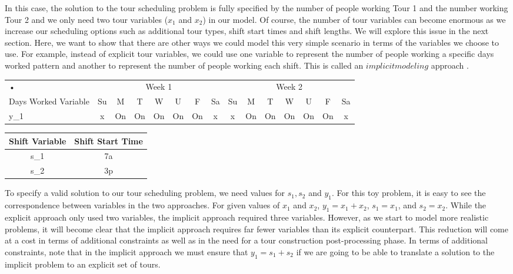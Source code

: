 \documentclass{article}
\begin{document}
In this case, the solution to the tour scheduling problem is fully specified by the number of people working Tour 1 and the number working Tour 2 and we only need two tour variables ($x_1$ and $x_2$) in our model. Of course, the number of tour variables can become enormous as we increase our scheduling options such as additional tour types, shift start times and shift lengths. We will explore this issue in the next section. Here, we want to show that there are other ways we could model this very simple scenario in terms of the variables we choose to use. For example, instead of explicit tour variables, we could use one variable to represent the number of people working a specific days worked pattern and another to represent the number of people working each shift. This is called an $implicit modeling$ approach \cite{}.

\begin{tabular}{|l|c|c|c|c|c|c|c|c|c|c|c|c|c|c|}
\hline 
• & \multicolumn{7}{c|}{Week 1} & \multicolumn{7}{c|}{Week 2} \\  
Days Worked Variable & Su & M & T & W & U & F & Sa & Su & M & T & W & U & F & Sa \\ 
\hline 
y_1 & x & On & On & On & On & On & x & x & On & On & On & On & On & x \\  
\hline 
\end{tabular}

\begin{tabular}{|c|c|}
\hline 
Shift Variable & Shift Start Time \\ 
\hline 
s_1 & 7a \\ 
\hline 
s_2 & 3p \\ 
\hline 
\end{tabular}

To specify a valid solution to our tour scheduling problem, we need values for $s_1, s_2$ and $y_1$. For this toy problem, it is easy to see the correspondence between variables in the two approaches. For given values of $x_1$ and $x_2$, $y_1 = x_1 + x_2$, $s_1 = x_1$, and $s_2 = x_2$. While the explicit approach only used two variables, the implicit approach required three variables. However, as we start to model more realistic problems, it will become clear that the implicit approach requires far fewer variables than its explicit counterpart. This reduction will come at a cost in terms of additional constraints as well as in the need for a tour construction post-processing phase. In terms of additional constraints, note that in the implicit approach we must ensure that $y_1 = s_1 + s_2$ if we are going to be able to translate a solution to the implicit problem to an explicit set of tours.
\end{document}
